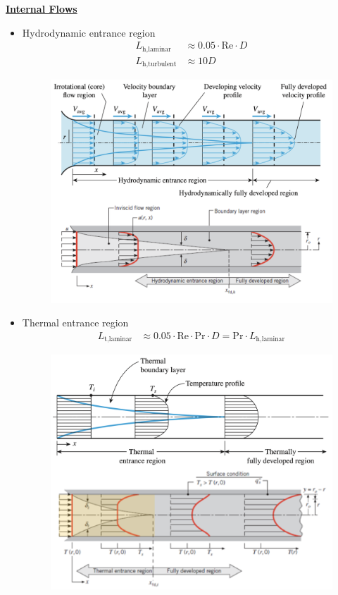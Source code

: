 \underline{\textbf{\large Internal Flows}}
\begin{itemize}
    \item Hydrodynamic entrance region
    \begin{align*}
        L_{\text{h,laminar}} &\approx 0.05 \cdot \text{Re} \cdot D \\
        L_{\text{h,turbulent}} &\approx 10D
    \end{align*}
    \begin{figure}[H]
        \centering
        \includegraphics[width=1.0\linewidth]{images/hydrodynamic_entrance.png}
    \end{figure}
    \item Thermal entrance region
        \begin{align*}
            L_{\text{t,laminar}} &\approx 0.05 \cdot \text{Re} \cdot \text{Pr} \cdot D = \text{Pr}\cdot L_{\text{h,laminar}}
        \end{align*}
        \begin{figure}[H]
            \centering
            \includegraphics[width=1.0\linewidth]{images/thermal_entrance.png}
        \end{figure}
\end{itemize}
